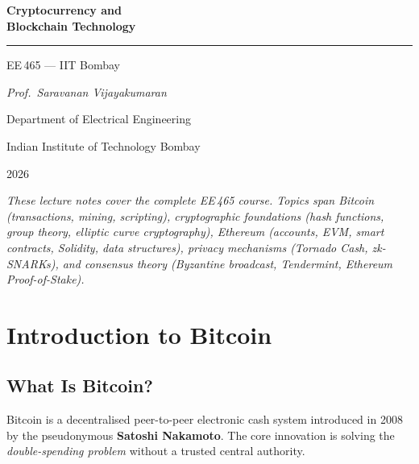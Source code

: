 \documentclass[12pt,a4paper,openany]{book}
\theoremstyle{definition}
\theoremstyle{plain}
\theoremstyle{remark}
\begin{document}

\begin{titlepage}
  \centering
  \vspace*{3cm}
  {\Huge\bfseries Cryptocurrency and\\ Blockchain Technology\par}
  \vspace{0.8cm}
  \rule{\textwidth}{1pt}\par
  \vspace{0.6cm}
  {\LARGE EE\,465 --- IIT Bombay\par}
  \vspace{1.2cm}
  {\large\itshape Prof.\ Saravanan Vijayakumaran\par}
  {\large Department of Electrical Engineering\par}
  {\large Indian Institute of Technology Bombay\par}
  \vspace{1.2cm}
  {\large 2026\par}
  \vspace{2cm}
  \begin{minipage}{0.85\textwidth}
    \itshape
    These lecture notes cover the complete EE\,465 course.  Topics span
    Bitcoin (transactions, mining, scripting), cryptographic foundations
    (hash functions, group theory, elliptic curve cryptography), Ethereum
    (accounts, EVM, smart contracts, Solidity, data structures), privacy
    mechanisms (Tornado Cash, zk-SNARKs), and consensus theory
    (Byzantine broadcast, Tendermint, Ethereum Proof-of-Stake).
  \end{minipage}
\end{titlepage}

\tableofcontents

\chapter{Introduction to Bitcoin}
\label{chap:bitcoin_intro}

\section{What Is Bitcoin?}

Bitcoin is a decentralised peer-to-peer electronic cash system introduced
in 2008 by the pseudonymous \textbf{Satoshi Nakamoto}.  The core
innovation is solving the \emph{double-spending problem} without a
trusted central authority.
\end{document}
